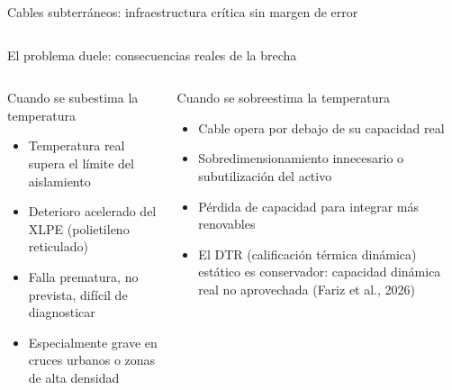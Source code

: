 \documentclass[aspectratio=169]{beamer}
\newcommand{\refcite}[1]{{\footnotesize\color{gray!70!black} #1}}
\begin{document}
\begin{frame}{Cables subterráneos: infraestructura crítica sin margen de error}
\begin{columns}[T]
\end{columns}
\end{frame}

\begin{frame}{El problema duele: consecuencias reales de la brecha}
\begin{columns}[T]
\begin{alertblock}{Cuando se subestima la temperatura}
\scriptsize
\begin{itemize}[leftmargin=*,itemsep=1pt]
    \item Temperatura real supera el límite del aislamiento
    \item Deterioro acelerado del XLPE (polietileno reticulado)
    \item Falla prematura, no prevista, difícil de diagnosticar
    \item Especialmente grave en cruces urbanos o zonas de alta densidad
\end{itemize}
\end{alertblock}
\begin{exampleblock}{Cuando se sobreestima la temperatura}
\scriptsize
\begin{itemize}[leftmargin=*,itemsep=1pt]
    \item Cable opera por debajo de su capacidad real
    \item Sobredimensionamiento innecesario o subutilización del activo
    \item Pérdida de capacidad para integrar más renovables
    \item El DTR (calificación térmica dinámica) estático es conservador:
          capacidad dinámica real no aprovechada \refcite{(Fariz et al., 2026)}
\end{itemize}
\end{exampleblock}
\end{columns}


\end{frame}
\end{document}
